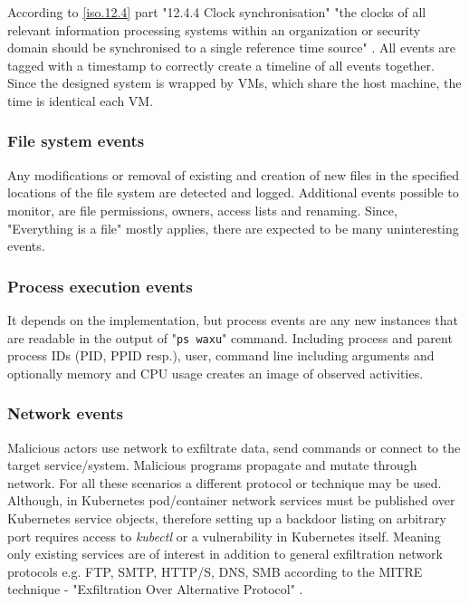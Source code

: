 According to \ref{iso.12.4} part "12.4.4 Clock synchronisation" "the clocks of all relevant information processing systems within an organization or security domain should be synchronised to a single reference time source" \cite{iso:27002}. All events are tagged with a timestamp to correctly create a timeline of all events together. Since the designed system is wrapped by VMs, which share the host machine, the time is identical each VM.

\subsubsection*{File system events \label{design:mon:events:fs}}
Any modifications or removal of existing and creation of new files in the specified locations of the file system are detected and logged. Additional events possible to monitor, are file permissions, owners, access lists and renaming. Since, "Everything is a file" mostly applies, there are expected to be many uninteresting events.

\subsubsection*{Process execution events \label{design:mon:events:proc}}
It depends on the implementation, but process events are any new instances that are readable in the output of "\texttt{ps waxu}" command. Including process and parent process IDs (PID, PPID resp.), user, command line including arguments and optionally memory and CPU usage creates an image of observed activities.

\subsubsection*{Network events \label{design:mon:events:net}}
Malicious actors use network to exfiltrate data, send commands or connect to the target service/system. Malicious programs propagate and mutate through network. For all these scenarios a different protocol or technique may be used. Although, in Kubernetes pod/container network services must be published over Kubernetes service objects, therefore setting up a backdoor listing on arbitrary port requires access to \textit{kubectl} or a vulnerability in Kubernetes itself. Meaning only existing services are of interest in addition to general exfiltration network protocols e.g. FTP, SMTP, HTTP/S, DNS, SMB according to the MITRE technique - "Exfiltration Over Alternative Protocol" \cite{mitre:T1048}.


